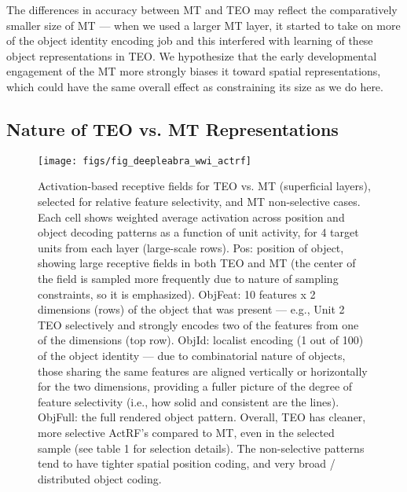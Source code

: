 \documentclass[11pt,twoside]{article}
\newif\myifpdf
\begin{document}

The differences in accuracy between MT and TEO may reflect the comparatively smaller size of MT --- when we used a larger MT layer, it started to take on more of the object identity encoding job and this interfered with learning of these object representations in TEO.  We hypothesize that the early developmental engagement of the MT more strongly biases it toward spatial representations, which could have the same overall effect as constraining its size as we do here.

\subsection{Nature of TEO vs. MT Representations}


\begin{figure}
  \centering\texttt{[image: figs/fig\_deepleabra\_wwi\_actrf]}
  \caption{\footnotesize Activation-based receptive fields for TEO vs. MT (superficial layers), selected for relative feature selectivity, and MT non-selective cases.  Each cell shows weighted average activation across position and object decoding patterns as a function of unit activity, for 4 target units from each layer (large-scale rows).  Pos: position of object, showing large receptive fields in both TEO and MT (the center of the field is sampled more frequently due to nature of sampling constraints, so it is emphasized).  ObjFeat: 10 features x 2 dimensions (rows) of the object that was present --- e.g., Unit 2 TEO selectively and strongly encodes two of the features from one of the dimensions (top row). ObjId: localist encoding (1 out of 100) of the object identity --- due to combinatorial nature of objects, those sharing the same features are aligned vertically or horizontally for the two dimensions, providing a fuller picture of the degree of feature selectivity (i.e., how solid and consistent are the lines).  ObjFull: the full rendered object pattern.  Overall, TEO has cleaner, more selective ActRF's compared to MT, even in the selected sample (see table 1 for selection details).  The non-selective patterns tend to have tighter spatial position coding, and very broad / distributed object coding.}
  \label{fig.actrf}
\end{figure}
\end{document}
